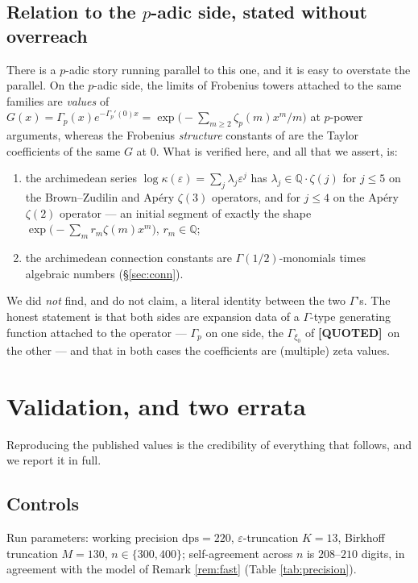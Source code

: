 \documentclass[11pt,reqno]{amsart}
\theoremstyle{plain}
\theoremstyle{definition}
\theoremstyle{remark}
\newcommand{\QUOTEDMARK}{{\normalfont\sffamily\bfseries[QUOTED]}}
\newcommand{\QUOTED}[1]{\QUOTEDMARK\,#1}
\newcommand{\QQ}{\mathbb{Q}}
\newcommand{\eps}{\varepsilon}
\newcommand{\dps}{\mathrm{dps}}
\begin{document}
\subsection{Relation to the $p$-adic side, stated without overreach}\label{sec:padic}
There is a $p$-adic story running parallel to this one, and it is easy to overstate the
parallel. On the $p$-adic side, the limits of Frobenius towers attached to the same families
are \emph{values} of $G(x)=\Gamma_p(x)e^{-\Gamma_p'(0)x}=\exp\bigl(-\sum_{m\ge2}\zeta_p(m)x^m/m\bigr)$
at $p$-power arguments, whereas the Frobenius \emph{structure} constants of
\cite{BeVl25} are the Taylor coefficients of the same $G$ at $0$. What is
verified here, and all that we assert, is:
\begin{enumerate}[label=(\alph*),leftmargin=2.2em]
\item the archimedean series $\log\kappa(\eps)=\sum_j\lambda_j\eps^{j}$ has
$\lambda_j\in\QQ\cdot\zeta(j)$ for $j\le5$ on the Brown--Zudilin and Ap\'ery $\zeta(3)$
operators, and for $j\le4$ on the Ap\'ery $\zeta(2)$ operator --- an initial segment of exactly
the shape $\exp\bigl(-\sum_m r_m\zeta(m)x^m\bigr)$, $r_m\in\QQ$;
\item the archimedean connection constants are $\Gamma(1/2)$-monomials times algebraic numbers
(\S\ref{sec:conn}).
\end{enumerate}
We did \emph{not} find, and do not claim, a literal identity between the two $\Gamma$'s. The
honest statement is that both sides are expansion data of a $\Gamma$-type generating function
attached to the operator --- $\Gamma_p$ on one side, the $\Gamma_{\xi_0}$ of
\QUOTED{\cite[Thm.~30]{BV}} on the other --- and that in both cases the coefficients are
(multiple) zeta values.

\section{Validation, and two errata}\label{sec:validate}

Reproducing the published values is the credibility of everything that follows, and we report it
in full.

\subsection{Controls}
Run parameters: working precision $\dps=220$, $\eps$-truncation $K=13$, Birkhoff truncation
$M=130$, $n\in\{300,400\}$; self-agreement across $n$ is $208$--$210$ digits, in agreement with
the model of Remark \ref{rem:fast} (Table \ref{tab:precision}).
\end{document}

